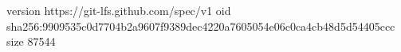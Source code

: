 version https://git-lfs.github.com/spec/v1
oid sha256:9909535c0d7704b2a9607f9389dec4220a7605054e06c0ca4cb48d5d54405ccc
size 87544
